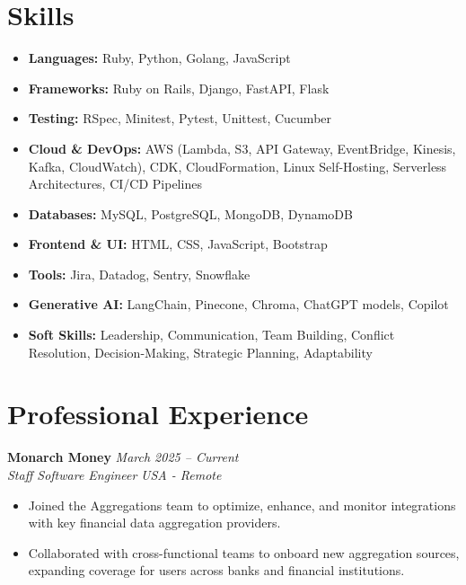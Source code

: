 \documentclass[a4paper,10pt]{article}
\begin{document}
\section*{Skills}
\sectionline
\vspace{-1em}
\begin{itemize}[leftmargin=0.5cm]
	\item \textbf{Languages:} Ruby, Python, Golang, JavaScript
	\item \textbf{Frameworks:} Ruby on Rails, Django, FastAPI, Flask
	\item \textbf{Testing:} RSpec, Minitest, Pytest, Unittest, Cucumber
	\item \textbf{Cloud \& DevOps:} AWS (Lambda, S3, API Gateway, EventBridge,
	      Kinesis, Kafka, CloudWatch), CDK, CloudFormation, Linux Self-Hosting,
	      Serverless Architectures, CI/CD Pipelines
	\item \textbf{Databases:} MySQL, PostgreSQL, MongoDB, DynamoDB
	\item \textbf{Frontend \& UI:} HTML, CSS, JavaScript, Bootstrap
	\item \textbf{Tools:} Jira, Datadog, Sentry, Snowflake
	\item \textbf{Generative AI:} LangChain, Pinecone, Chroma, ChatGPT models,
	      Copilot
	\item \textbf{Soft Skills:} Leadership, Communication, Team Building,
	      Conflict Resolution, Decision-Making, Strategic Planning, Adaptability
\end{itemize}

\section*{Professional Experience}
\sectionline
\vspace{-1em}

\textbf{Monarch Money} \hfill \textit{March 2025 -- Current}\\
\textit{Staff Software Engineer} \hfill \textit{USA - Remote}\\
\begin{itemize}[leftmargin=0.5cm, topsep=0pt, parsep=0pt, itemsep=2pt]
    \item Joined the Aggregations team to optimize, enhance, and monitor
          integrations with key financial data aggregation providers.
    \item Collaborated with cross-functional teams to onboard new aggregation
          sources, expanding coverage for users across banks and financial
          institutions.
\end{itemize}
\end{document}
